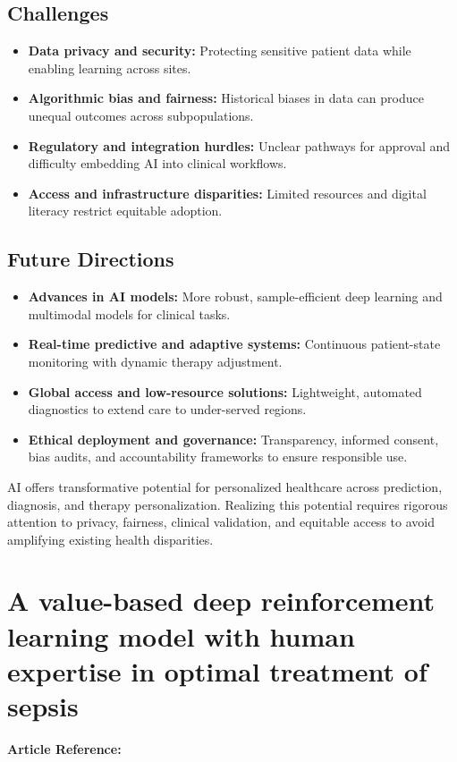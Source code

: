 \subsection*{Challenges}
\begin{itemize}
    \item \textbf{Data privacy and security:} Protecting sensitive patient data while enabling learning across sites.
    \item \textbf{Algorithmic bias and fairness:} Historical biases in data can produce unequal outcomes across subpopulations.
    \item \textbf{Regulatory and integration hurdles:} Unclear pathways for approval and difficulty embedding AI into clinical workflows.
    \item \textbf{Access and infrastructure disparities:} Limited resources and digital literacy restrict equitable adoption.
\end{itemize}

\subsection*{Future Directions}
\begin{itemize}
    \item \textbf{Advances in AI models:} More robust, sample-efficient deep learning and multimodal models for clinical tasks.
    \item \textbf{Real-time predictive and adaptive systems:} Continuous patient-state monitoring with dynamic therapy adjustment.
    \item \textbf{Global access and low-resource solutions:} Lightweight, automated diagnostics to extend care to under-served regions.
    \item \textbf{Ethical deployment and governance:} Transparency, informed consent, bias audits, and accountability frameworks to ensure responsible use.
\end{itemize}

AI offers transformative potential for personalized healthcare across prediction, diagnosis, and therapy personalization. Realizing this potential requires rigorous attention to privacy, fairness, clinical validation, and equitable access to avoid amplifying existing health disparities.

\section{A value-based deep reinforcement learning model with human expertise in optimal treatment of sepsis}
\textbf{Article Reference:} \cite{wuValuebasedDeepReinforcement2023}

